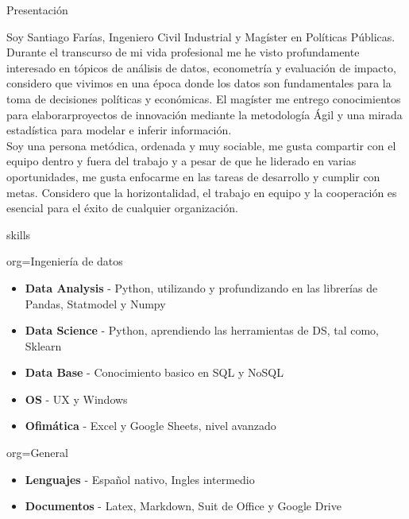 \documentclass{resume}
\begin{document}
\makeheader
\begin{ResumeSection}{Presentación}
    \begin{ResumeSubsection}{}
Soy Santiago Farías, Ingeniero Civil Industrial y Magíster en Políticas Públicas. Durante el transcurso de mi vida profesional me he visto profundamente interesado en tópicos de análisis de datos, econometría y evaluación de impacto, considero que vivimos en una época donde los datos son fundamentales para la toma de decisiones políticas y económicas. El magíster me entrego conocimientos para elaborarproyectos de innovación mediante la metodología Ágil y una mirada estadística para modelar e inferir información.
\\
Soy una persona metódica, ordenada y muy sociable, me gusta compartir con el equipo dentro y fuera del trabajo y a pesar de que he liderado en varias oportunidades, me gusta enfocarme en las tareas de desarrollo y cumplir con metas. Considero que la horizontalidad, el trabajo en equipo y la cooperación es esencial para el éxito de cualquier organización. 
    \end{ResumeSubsection}
    
\begin{ResumeSection}{skills}
    \newcommand{\skill}[2]{\textbf{#1} - #2}
    \begin{ResumeSubsection}{org=Ingeniería de datos}
        \begin{itemize}
            \item \skill{Data Analysis}{Python, utilizando y profundizando en las librerías de Pandas, Statmodel y Numpy}
            \item \skill{Data Science}{Python, aprendiendo las herramientas de DS, tal como, Sklearn}            
            \item \skill{Data Base}{Conocimiento basico en SQL y NoSQL }
            \item \skill{OS}{UX y Windows}
            \item \skill{Ofimática}{Excel y Google Sheets, nivel avanzado }
        \end{itemize}
    \end{ResumeSubsection}
    \begin{ResumeSubsection}{org=General}
        \begin{itemize}
            \item \skill{Lenguajes}{Español nativo, Ingles intermedio}
            \item \skill{Documentos}{Latex, Markdown, Suit de Office y Google Drive}
        \end{itemize}
    \end{ResumeSubsection}



\end{ResumeSection}
\end{ResumeSection}
\end{document}
